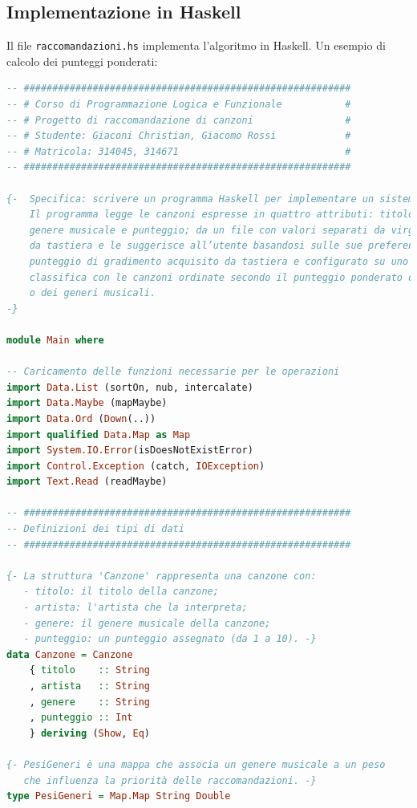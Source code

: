 \documentclass[a4paper,11pt]{article}
\begin{document}
\subsection{Implementazione in Haskell}
Il file \texttt{raccomandazioni.hs} implementa l'algoritmo in Haskell. Un esempio di calcolo dei punteggi ponderati:
\begin{lstlisting}[language=Haskell]
-- #########################################################
-- # Corso di Programmazione Logica e Funzionale           #
-- # Progetto di raccomandazione di canzoni                #
-- # Studente: Giaconi Christian, Giacomo Rossi            #
-- # Matricola: 314045, 314671                             #
-- #########################################################

{-  Specifica: scrivere un programma Haskell per implementare un sistema di raccoandazione di canzoni.
    Il programma legge le canzoni espresse in quattro attributi: titolo, artista,
    genere musicale e punteggio; da un file con valori separati da virgole, il cui nome viene acquisito
    da tastiera e le suggerisce all’utente basandosi sulle sue preferenze musicali, utilizzando un
    punteggio di gradimento acquisito da tastiera e configurato su uno o più generi, per creare una
    classifica con le canzoni ordinate secondo il punteggio ponderato da quello di gradimento del
    o dei generi musicali.
-}

module Main where

-- Caricamento delle funzioni necessarie per le operazioni
import Data.List (sortOn, nub, intercalate)
import Data.Maybe (mapMaybe)
import Data.Ord (Down(..))
import qualified Data.Map as Map
import System.IO.Error(isDoesNotExistError)
import Control.Exception (catch, IOException)
import Text.Read (readMaybe)

-- #########################################################
-- Definizioni dei tipi di dati
-- #########################################################

{- La struttura 'Canzone' rappresenta una canzone con:
   - titolo: il titolo della canzone;
   - artista: l'artista che la interpreta;
   - genere: il genere musicale della canzone;
   - punteggio: un punteggio assegnato (da 1 a 10). -} 
data Canzone = Canzone
    { titolo    :: String
    , artista   :: String
    , genere    :: String
    , punteggio :: Int
    } deriving (Show, Eq)

{- PesiGeneri è una mappa che associa un genere musicale a un peso
   che influenza la priorità delle raccomandazioni. -}
type PesiGeneri = Map.Map String Double


\end{lstlisting}
\end{document}
